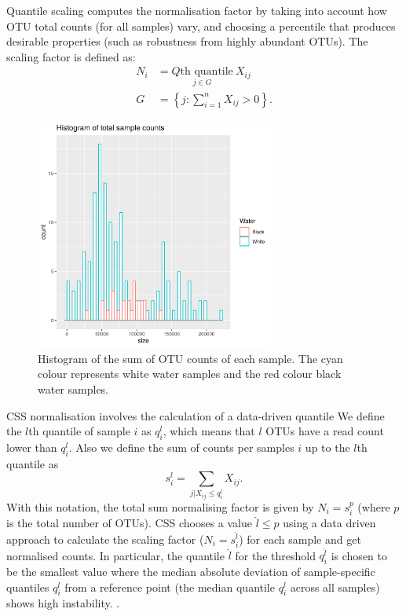 Quantile scaling computes the normalisation factor by taking into account how OTU total counts (for all samples) vary, and choosing a percentile that produces desirable properties (such as robustness from highly abundant OTUs).
The scaling factor is defined as:
\begin{align}
	N_i &= \underset{ j \in G}{ Q\text{th quantile}} \  X_{ij}\\
	G  &= \left\{ j : \sum_{i = 1}^{n} X_{ij} > 0\right\}.
\end{align}

 
\begin{figure}[htb]
\centering
\includegraphics[width = 0.7\textwidth]{histogramofcountdata}
\caption{Histogram of the sum of OTU counts of each sample. The cyan colour represents white water samples and the red colour black water samples.}
\label{fig:counthistogram}
\end{figure}

CSS normalisation involves the calculation of a data-driven quantile 
We define the $l$th quantile of sample $i$ as $q_i^l$, which means that $l$ OTUs have a read count lower than $q_i^l$. Also we define the sum of counts per samples $i$ up to the $l$th quantile as
\begin{equation}
	s_{i}^{l}=\sum_{j|X_{ij} \leq q_{i}^{l}} X_{ij}.
\end{equation} 
With this notation, the total sum normalising factor is given by $N_i = s_i^p$ (where $p$ is the total number of OTUs). CSS chooses a value $\hat{l} \leq p$ using a data driven approach to calculate the scaling factor ($N_i = s_i^{\hat{l}}$) for each sample and get normalised counts.
In particular, the quantile $\hat{l}$ for the threshold $q_i^{\hat{l}}$ is chosen  to be the smallest value where the median absolute deviation of sample-specific quantiles $q_i^l$ from a reference point (the median quantile $q_i^l$ across all samples) shows high instability. \cite{css_diff_abund}.

